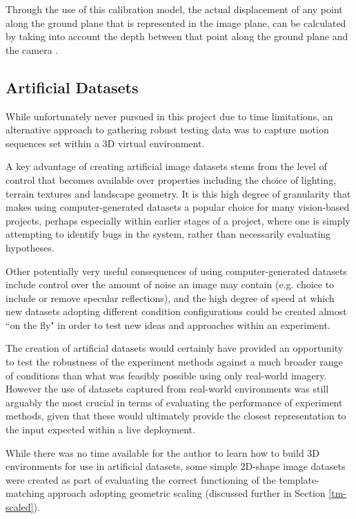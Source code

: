 Through the use of this calibration model, the actual displacement of any point along the ground plane that is represented in the image plane, can be calculated by taking into account the depth between that point along the ground plane and the camera \cite{campbell}.


\subsection{Artificial Datasets}

While unfortunately never pursued in this project due to time limitations, an alternative approach to gathering robust testing data was to capture motion sequences set within a 3D virtual environment. 

A key advantage of creating artificial image datasets stems from the level of control that becomes available over properties including the choice of lighting, terrain textures and landscape geometry. It is this high degree of granularity that makes using computer-generated datasets a popular choice for many vision-based projects, perhaps especially within earlier stages of a project, where one is simply attempting to identify bugs in the system, rather than necessarily evaluating hypotheses. 

Other potentially very useful consequences of using computer-generated datasets include control over the amount of noise an image may contain (e.g. choice to include or remove specular reflections), and the high degree of speed at which new datasets adopting different condition configurations could be created almost ``on the fly" in order to test new ideas and approaches within an experiment. 

The creation of artificial datasets would certainly have provided an opportunity to test the robustness of the experiment methods against a much broader range of conditions than what was feasibly possible using only real-world imagery. However the use of datasets captured from real-world environments was still arguably the most crucial in terms of evaluating the performance of experiment methods, given that these would ultimately provide the closest representation to the input expected within a live deployment. 


While there was no time available for the author to learn how to build 3D environments for use in artificial datasets, some simple 2D-shape image datasets were created as part of evaluating the correct functioning of the template-matching approach adopting geometric scaling (discussed further in Section \ref{tm-scaled}).

